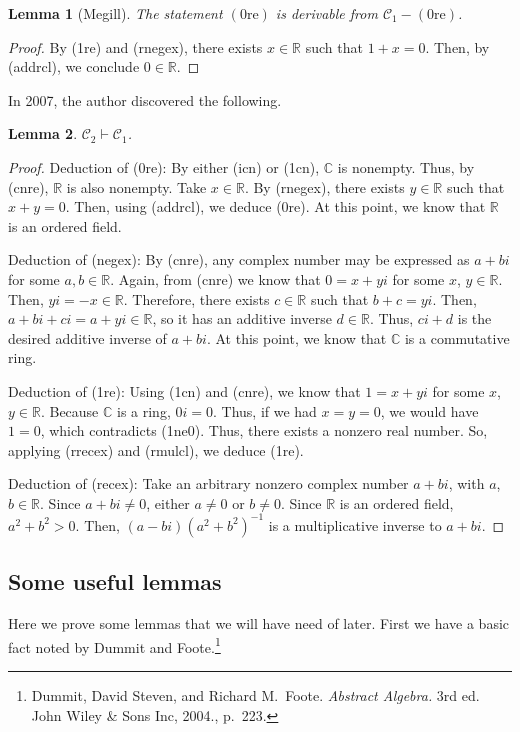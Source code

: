 \documentclass{article}
\newcommand\bC{\mathbb{C}}
\newcommand\bR{\mathbb{R}}
\newcommand\cC{\mathcal{C}}
\newtheorem{lemma}{Lemma}[section]
\begin{document}
\begin{lemma}[Megill]
The statement $\mathrm{(0re)}$ is derivable from $\cC_1 - \mathrm{(0re)}$.
\end{lemma}
\begin{proof}
By (1re) and (rnegex), there exists $x \in \bR$ such that $1 + x = 0$. Then, by (addrcl), we conclude $0 \in \bR$.
\end{proof}
In 2007, the author discovered the following.
\begin{lemma}
\label{c2->c1}
$\cC_2 \vdash \cC_1$.
\end{lemma}
\begin{proof}
Deduction of (0re): By either (icn) or (1cn), $\bC$ is nonempty. Thus, by (cnre), $\bR$ is also nonempty. Take $x \in \bR$. By (rnegex), there exists $y \in \bR$ such that $x + y = 0$. Then, using (addrcl), we deduce (0re). At this point, we know that $\bR$ is an ordered field.

Deduction of (negex): By (cnre), any complex number may be expressed as $a + bi$ for some $a,b \in \bR$. Again, from (cnre) we know that $0 = x + yi$ for some $x$, $y \in \bR$. Then, $yi = -x \in \bR$. Therefore, there exists $c \in \bR$ such that $b + c = yi$. Then, $a + bi + ci = a + yi \in \bR$, so it has an additive inverse $d \in \bR$. Thus, $ci + d$ is the desired additive inverse of $a + bi$. At this point, we know that $\bC$ is a commutative ring.

Deduction of (1re): Using (1cn) and (cnre), we know that $1 = x + yi$ for some $x$, $y \in \bR$. Because $\bC$ is a ring, $0i = 0$. Thus, if we had $x=y=0$, we would have $1 = 0$, which contradicts (1ne0). Thus, there exists a nonzero real number. So, applying (rrecex) and (rmulcl), we deduce (1re).

Deduction of (recex): Take an arbitrary nonzero complex number $a + bi$, with $a$, $b \in \bR$. Since $a + bi \ne 0$, either $a \ne 0$ or $b \ne 0$. Since $\bR$ is an ordered field, $a^2 + b^2 > 0$. Then, $(a - bi)(a^2 + b^2)^{-1}$ is a multiplicative inverse to $a + bi$.
\end{proof}

\subsection{Some useful lemmas}

Here we prove some lemmas that we will have need of later. First we have a basic fact noted by Dummit and Foote.\footnote{Dummit, David Steven, and Richard M.~Foote. \textit{Abstract Algebra.} 3rd ed. John Wiley \& Sons Inc, 2004., p.~223.}
\end{document}
